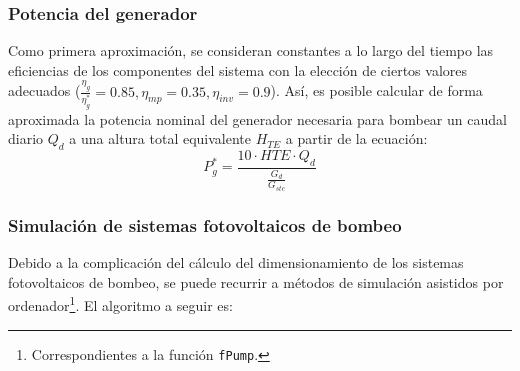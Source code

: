\subsubsection{Potencia del generador}
\label{sec:org92df7fa}
Como primera aproximación, se consideran constantes a lo largo del tiempo las eficiencias de los componentes del sistema con la elección de ciertos valores adecuados (\(\frac{\eta_g}{\eta_g^*}=0.85, \eta_{mp}=0.35, \eta_{inv}=0.9\)). Así, es posible calcular de forma aproximada la potencia nominal del generador necesaria para bombear un caudal diario \(Q_d\) a una altura total equivalente \(H_{TE}\) a partir de la ecuación:
\begin{equation}
P^*_g = \frac{10 \cdot HTE \cdot Q_d}{\frac{G_d}{G_{stc}}}
\end{equation}

\subsubsection{Simulación de sistemas fotovoltaicos de bombeo}
\label{sec:org25ced89}
Debido a la complicación del cálculo del dimensionamiento de los sistemas fotovoltaicos de bombeo, se puede recurrir a métodos de simulación asistidos por ordenador\footnote{Correspondientes a la función \texttt{fPump}.}. El algoritmo a seguir es:

